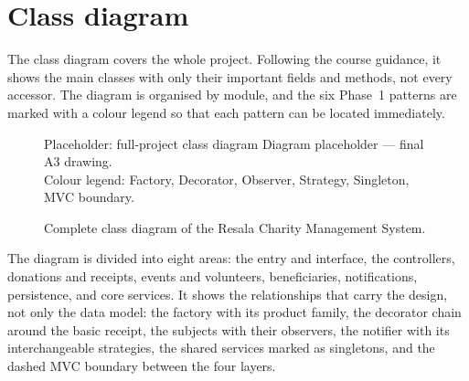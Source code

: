 \section{Class diagram}

The class diagram covers the whole project. Following the course guidance, it shows the main classes with only their important fields and methods, not every accessor. The diagram is organised by module, and the six Phase~1 patterns are marked with a colour legend so that each pattern can be located immediately.

\begin{figure}[H]
  \centering
  \begin{diagrambox}{Placeholder: full-project class diagram}
    Diagram placeholder --- final A3 drawing.\\
    Colour legend: Factory, Decorator, Observer, Strategy, Singleton, MVC boundary.
  \end{diagrambox}
  \caption{Complete class diagram of the Resala Charity Management System.}
  \label{fig:classdiagram}
\end{figure}

The diagram is divided into eight areas: the entry and interface, the controllers, donations and receipts, events and volunteers, beneficiaries, notifications, persistence, and core services. It shows the relationships that carry the design, not only the data model: the factory with its product family, the decorator chain around the basic receipt, the subjects with their observers, the notifier with its interchangeable strategies, the shared services marked as singletons, and the dashed MVC boundary between the four layers.
